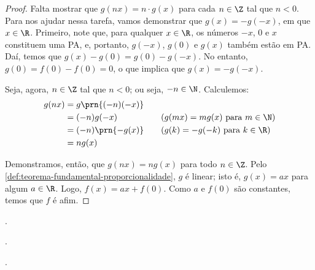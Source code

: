 \begin{proof}
	Falta mostrar que $g(nx) = n \cdot g(x)$ para cada $n \in \Z$ tal que $n < 0$.
	Para nos ajudar nessa tarefa, vamos demonstrar que $g(x) = -g(-x)$, em que $x \in \R$. 
	Primeiro, note que, para qualquer $x \in \R$, os números $-x$, $0$ e $x$
	constituem uma PA, e, portanto, $g(-x)$, $g(0)$ e $g(x)$ também estão em PA. Daí, temos que $g(x) - g(0) = 
	g(0)-g(-x)$. No entanto, $g(0) = f(0) - f(0) = 0$, o que implica que $g(x) = -g(-x)$.

	Seja, agora, $n \in \Z$ tal que $n < 0$; ou seja, $-n \in \N$. Calculemos:
	\begin{alignat*}{3}
		g(nx) &= g\prn{(-n)(-x)} &&  \\
		&= (-n)g(-x) && \quad\text{($g(mx) = mg(x)$ para $m\in\N$)} \\
		&= (-n)\prn{-g(x)} && \quad\text{($g(k) = -g(-k)$ para $k \in \R$)} \\
		&= ng(x)
	\end{alignat*}

	Demonstramos, então, que $g(nx) = ng(x)$ para todo $n \in \Z$. Pelo \ref{def:teorema-fundamental-proporcionalidade},
	$g$ é linear; isto é, $g(x) = ax$ para algum $a \in \R$. Logo, $f(x) = ax + f(0)$. Como $a$ e $f(0)$ são constantes,
	temos que $f$ é afim.

	
 \end{proof}

\begin{onlineact}
	.
\end{onlineact}

\begin{onlineact}
	.
\end{onlineact}

\begin{onlineact}
	.
\end{onlineact}